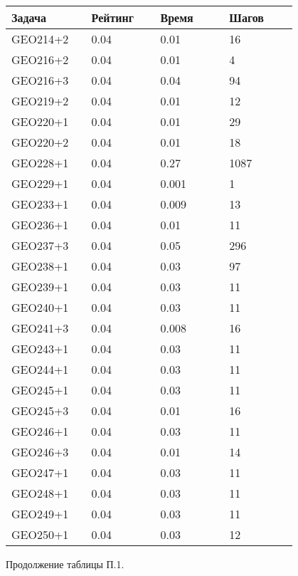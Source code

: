 \begin{longtable}[H]{|p{0.2\linewidth}|p{0.2\linewidth}|p{0.2\linewidth}|p{0.2\linewidth}|}
\hline
\textbf{Задача} & \textbf{Рейтинг} & \textbf{Время} & \textbf{Шагов} \\
\hline
GEO214+2 &  0.04 &  0.01 &  16 \\
\hline
GEO216+2 &  0.04 &  0.01 &  4 \\
\hline
GEO216+3 &  0.04 &  0.04 &  94 \\
\hline
GEO219+2 &  0.04 &  0.01 &  12 \\
\hline
GEO220+1 &  0.04 &  0.01 &  29 \\
\hline
GEO220+2 &  0.04 &  0.01 &  18 \\
\hline
GEO228+1 &  0.04 &  0.27 &  1087 \\
\hline
GEO229+1 &  0.04 &  0.001 &  1 \\
\hline
GEO233+1 &  0.04 &  0.009 &  13 \\
\hline
GEO236+1 &  0.04 &  0.01 &  11 \\
\hline
GEO237+3 &  0.04 &  0.05 &  296 \\
\hline
GEO238+1 &  0.04 &  0.03 &  97 \\
\hline
GEO239+1 &  0.04 &  0.03 &  11 \\
\hline
GEO240+1 &  0.04 &  0.03 &  11 \\
\hline
GEO241+3 &  0.04 &  0.008 &  16 \\
\hline
GEO243+1 &  0.04 &  0.03 &  11 \\
\hline
GEO244+1 &  0.04 &  0.03 &  11 \\
\hline
GEO245+1 &  0.04 &  0.03 &  11 \\
\hline
GEO245+3 &  0.04 &  0.01 &  16 \\
\hline
GEO246+1 &  0.04 &  0.03 &  11 \\
\hline
GEO246+3 &  0.04 &  0.01 &  14 \\
\hline
GEO247+1 &  0.04 &  0.03 &  11 \\
\hline
GEO248+1 &  0.04 &  0.03 &  11 \\
\hline
GEO249+1 &  0.04 &  0.03 &  11 \\
\hline
GEO250+1 &  0.04 &  0.03 &  12 \\
\hline
\end{longtable}
\begin{center}
Продолжение таблицы П.1.
\end{center}

